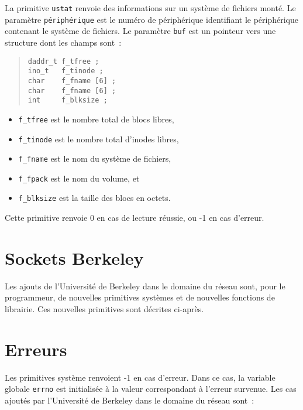 \documentclass [twoside] {report}
\begin{document}
La primitive {\tt ustat} renvoie des informations
sur un système de fichiers monté. Le paramètre
{\tt périphérique} est le numéro de périphérique
identifiant le périphérique contenant le système
de fichiers. Le paramètre {\tt buf} est un pointeur
vers une structure dont les champs sont~:

\begin {quote}
\begin {verbatim}
daddr_t f_tfree ;
ino_t   f_tinode ;
char    f_fname [6] ;
char    f_fname [6] ;
int     f_blksize ;
\end{verbatim}
\end {quote}

\begin {itemize}
    \item {\tt f\_tfree} est le nombre total de blocs libres,
    \item {\tt f\_tinode} est le nombre total d'inodes libres,
    \item {\tt f\_fname} est le nom du système de fichiers,
    \item {\tt f\_fpack} est le nom du volume, et
    \item {\tt f\_blksize} est la taille des blocs en octets.
\end {itemize}

Cette primitive renvoie 0 en cas de lecture
réussie, ou -1 en cas d'erreur.



\section {Sockets Berkeley}

Les ajouts de l'Université de Berkeley dans le domaine du
réseau sont, pour le programmeur, de nouvelles primitives
systèmes et de nouvelles fonctions de librairie. Ces nouvelles
primitives sont décrites ci-après.

\section* {Erreurs}

Les primitives système renvoient -1 en cas d'erreur. Dans ce
cas, la variable globale {\tt errno} est initialisée à la
valeur correspondant à l'erreur survenue. Les cas ajoutés
par l'Université de Berkeley dans le domaine du réseau sont~:
\end{document}
